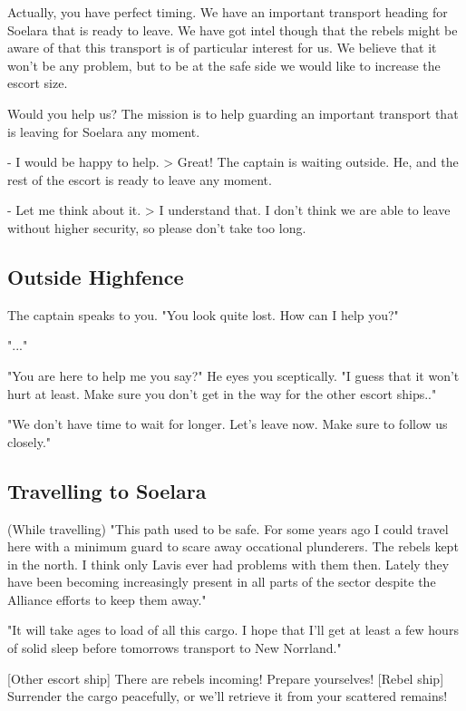 \documentclass[a4paper,12pt]{article}
\begin{document}
Actually, you have perfect timing. We have an important transport heading
for Soelara that is ready to leave. We have got intel though that the rebels
might be aware of that this transport is of particular interest for us.
We believe that it won't be any problem, but to be at the safe side we would
like to increase the escort size.

Would you help us? The mission is to help guarding an important transport
that is leaving for Soelara any moment.

- I would be happy to help.
> Great! The captain is waiting outside. He, and the rest of the escort
is ready to leave any moment.

- Let me think about it.
> I understand that. I don't think we are able to leave without higher
security, so please don't take too long.

\subsection{Outside Highfence}

The captain speaks to you. "You look quite lost. How can I help you?"

"..."

"You are here to help me you say?" He eyes you sceptically. "I guess that
it won't hurt at least. Make sure you don't get in the way for the other
escort ships.."

"We don't have time to wait for longer. Let's leave now. Make sure to follow
us closely."

\subsection{Travelling to Soelara}

(While travelling)
"This path used to be safe. For some years ago I could travel here with a
minimum guard to scare away occational plunderers. The rebels kept in the
north. I think only Lavis ever had problems with them then.
Lately they have been becoming increasingly present in all parts of the sector
despite the Alliance efforts to keep them away."

"It will take ages to load of all this cargo. I hope that I'll get at least
a few hours of solid sleep before tomorrows transport to New Norrland."

[Other escort ship] There are rebels incoming! Prepare yourselves!
[Rebel ship] Surrender the cargo peacefully, or we'll retrieve it from
your scattered remains!\\
\end{document}
